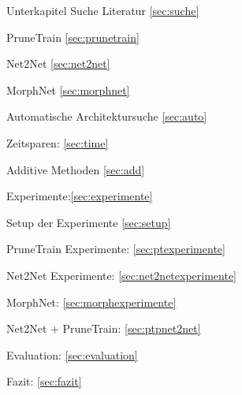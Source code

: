 Unterkapitel Suche Literatur \ref{sec:suche}

PruneTrain \ref{sec:prunetrain}

Net2Net \ref{sec:net2net}

MorphNet \ref{sec:morphnet}

Automatische Architektursuche \ref{sec:auto}

Zeitsparen: \ref{sec:time}

Additive Methoden \ref{sec:add}

Experimente:\ref{sec:experimente}

Setup der Experimente \ref{sec:setup}

PruneTrain Experimente: \ref{sec:ptexperimente}

Net2Net Experimente: \ref{sec:net2netexperimente}

MorphNet: \ref{sec:morphexperimente}

Net2Net + PruneTrain: \ref{sec:ptpnet2net}

Evaluation: \ref{sec:evaluation}

Fazit: \ref{sec:fazit}
\color{black}
